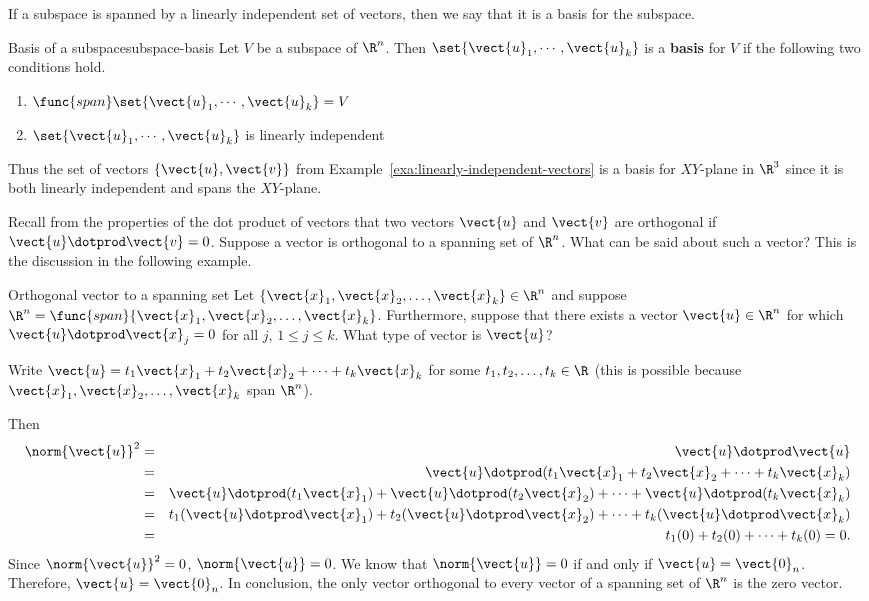 If a subspace is spanned by a linearly independent set of vectors,
then we say that it is a basis for the subspace.

\begin{definition}{Basis of a subspace}{subspace-basis}
Let $V$ be a subspace of $\R^{n}$. Then $\set{
\vect{u}_{1},\cdots ,\vect{u}_{k}} $ is a \textbf{basis} for
$V$ if the following two conditions
hold.

\begin{enumerate}
\item $\func{span}\set{\vect{u}_{1},\cdots ,\vect{u}_{k}} =V$
\item $\set{\vect{u}_{1},\cdots ,\vect{u}_{k}} $ is linearly
independent
\end{enumerate}
\end{definition}

Thus the set of vectors $\{\vect{u}, \vect{v}\}$ from Example~\ref{exa:linearly-independent-vectors} is a basis for $XY$-plane in
$\R^{3}$ since it is both linearly independent and spans
the $XY$-plane.

 Recall from the properties of the dot product of vectors 
that two vectors $\vect{u}$ and $\vect{v}$ are orthogonal if $\vect{u}
\dotprod \vect{v} = 0$. Suppose a vector is orthogonal to a spanning set of $\R^n$. What can be said about such a vector? This is the discussion in the following example.

\begin{example}{Orthogonal vector to a spanning set}{}
Let $\{\vect{x}_1, \vect{x}_2, \ldots, \vect{x}_k\}\in\R^n$ and
suppose $\R^n=\func{span}\{\vect{x}_1, \vect{x}_2, \ldots, \vect{x}_k\}$.
Furthermore, suppose that there exists a vector $\vect{u}\in\R^n$ for which $\vect{u}\dotprod \vect{x}_j=0$ for all $j$, $1\leq j\leq k$.
What type of vector is $\vect{u}$?
\end{example}

\begin{solution}
Write $\vect{u}=t_1\vect{x}_1 + t_2\vect{x}_2 +\cdots +t_k\vect{x}_k$
for some $t_1, t_2, \ldots, t_k\in\R$
(this is possible because
$\vect{x}_1, \vect{x}_2, \ldots, \vect{x}_k$ span $\R^n$).
 
Then
\begin{eqnarray*}
\norm{\vect{u}}^2 & = & \vect{u}\dotprod\vect{u} \\
& = & \vect{u}\dotprod(t_1\vect{x}_1 + t_2\vect{x}_2 +\cdots +t_k\vect{x}_k) \\
& = & \vect{u}\dotprod (t_1\vect{x}_1) +  \vect{u}\dotprod (t_2\vect{x}_2) +
\cdots +  \vect{u}\dotprod (t_k\vect{x}_k) \\
& = & t_1(\vect{u}\dotprod \vect{x}_1) + t_2(\vect{u}\dotprod \vect{x}_2) + \cdots 
+ t_k(\vect{u}\dotprod \vect{x}_k) \\
& = & t_1(0) + t_2(0) + \cdots + t_k(0) = 0.
\end{eqnarray*}
Since $\norm{\vect{u}}^2 =0$, $\norm{\vect{u}} =0$.
We know that $\norm{\vect{u}}=0$ if and only if 
$\vect{u}=\vect{0}_n$.
Therefore, $\vect{u}=\vect{0}_n$.
In conclusion, the only vector orthogonal to every vector of
a spanning set of $\R^n$ is the zero vector.
\end{solution}

